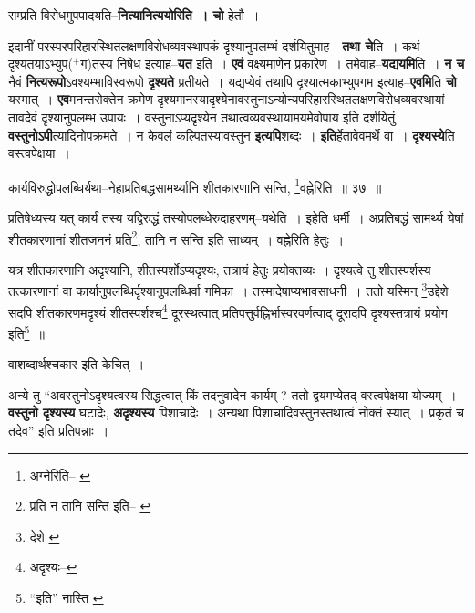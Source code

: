 \documentclass[article,12pt,a4paper]{memoir}
\newcommand{\add}[1]{($^{+}$#1)}
\begin{document}
	  \pstart सम्प्रति विरोधमुपपादयति--\textbf{नित्यानित्ययोरिति । चो} हेतौ ।
	\pend
      

	  \pstart इदानीं परस्परपरिहारस्थितलक्षणविरोधव्यवस्थापकं दृश्यानुपलम्भं दर्शयितुमाह—\textbf{तथा चे}ति । कथं दृश्यतयाऽभ्युप\add{ग}तस्य निषेध इत्याह--\textbf{यत} इति । \textbf{एवं} वक्ष्यमाणेन प्रकारेण । तमेवाह--\textbf{यद्ययमि}ति । \textbf{न च} नैवं \textbf{नित्यरूपो}ऽवश्यम्भाविस्वरूपो \textbf{दृश्यते} प्रतीयते । यद्यप्येवं तथापि दृश्यात्मकाभ्युपगम इत्याह--\textbf{एवमि}ति \textbf{चो} यस्मात् । \textbf{एव}मनन्तरोक्तेन क्रमेण दृश्यमानस्यादृश्येनावस्तुनाऽन्योन्यपरिहारस्थितलक्षणविरोधव्यवस्थायां तावदेवं दृश्यानुपलम्भ उपायः । वस्तुनाऽप्यदृश्येन तथात्वव्यवस्थायामयमेवोपाय इति दर्शयितुं \textbf{वस्तुनोऽपी}त्यादिनोपक्रमते । न केवलं कल्पितस्यावस्तुन \textbf{इत्यपि}शब्दः । \textbf{इति}र्हेतावेवमर्थे वा । \textbf{दृश्यस्ये}ति वस्त्वपेक्षया ।
	\pend
      \leavevmode{}
	  \bigskip
	  \begingroup
	
	  \bigskip
	  \begingroup
	

	  \pstart कार्यविरुद्धोपलब्धिर्यथा--नेहाप्रतिबद्धसामर्थ्यानि शीतकारणानि सन्ति, \footnote{अग्नेरिति--\cite{dp-msB} \cite{dp-msC} \cite{dp-edP} \cite{dp-edH} \cite{dp-edE} \cite{dp-edN}}वह्नेरिति ॥ ३७ ॥
	\pend
      
	  \endgroup
	 

	  \pstart प्रतिषेध्यस्य यत् कार्यं तस्य यद्विरुद्धं तस्योपलब्धेरुदाहरणम्--यथेति । इहेति धर्मी । अप्रतिबद्धं सामर्थ्य येषां शीतकारणानां शीतजननं प्रति\footnote{प्रति न तानि सन्ति इति--\cite{dp-msA} \cite{dp-edP} \cite{dp-edH} \cite{dp-edE} \cite{dp-edN}}, तानि न सन्ति इति साध्यम् । वह्नेरिति हेतुः ।
	\pend
       

	  \pstart यत्र शीतकारणानि अदृश्यानि, शीतस्पर्शोऽप्यदृश्यः, तत्रायं हेतुः प्रयोक्तव्यः । दृश्यत्वे तु शीतस्पर्शस्य तत्कारणानां वा कार्यानुपलब्धिर्दृश्यानुपलब्धिर्वा गमिका । तस्मादेषाप्यभावसाधनी । ततो यस्मिन् \footnote{देशे \cite{dp-msA} \cite{dp-msB} \cite{dp-msC} \cite{dp-msD} \cite{dp-edP} \cite{dp-edH} \cite{dp-edE} \cite{dp-edN}}उद्देशे सदपि शीतकारणमदृश्यं शीतस्पर्शश्च\footnote{अदृश्यः--\cite{dp-msD-n}} दूरस्थत्वात् प्रतिपत्तुर्वह्निर्भास्वरवर्णत्वाद् दूरादपि दृश्यस्तत्रायं प्रयोग इति\footnote{“इति” नास्ति \cite{dp-msA} \cite{dp-msB} \cite{dp-edP} \cite{dp-edH} \cite{dp-edE} \cite{dp-edN}} ॥
	\pend
      
	  \endgroup
	

	  \pstart वाशब्दार्थश्चकार इति केचित् ।
	\pend
      

	  \pstart अन्ये तु “अवस्तुनोऽदृश्यत्वस्य सिद्धत्वात् किं तदनुवादेन कार्यम् ? ततो द्वयमप्येतद् वस्त्वपेक्षया योज्यम् । \textbf{वस्तुनो दृश्यस्य} घटादेः, \textbf{अदृश्यस्य} पिशाचादेः । अन्यथा पिशाचादिवस्तुनस्तथात्वं नोक्तं स्यात् । प्रकृतं च तदेव” इति प्रतिपन्नाः ।
	\pend
      
\end{document}
